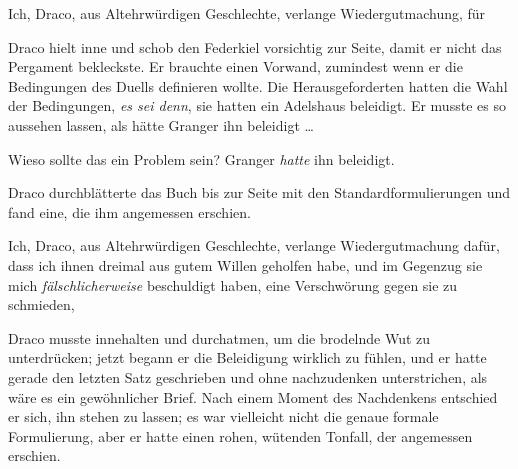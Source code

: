 \begin{writtenNote}
Ich, Draco, aus Altehrwürdigen Geschlechte, verlange Wiedergutmachung, für
\end{writtenNote}

Draco hielt inne und schob den Federkiel vorsichtig zur Seite, damit er nicht das Pergament bekleckste. Er brauchte einen Vorwand, zumindest wenn er die Bedingungen des Duells definieren wollte. Die Herausgeforderten hatten die Wahl der Bedingungen, \emph{es sei denn}, sie hatten ein Adelshaus beleidigt. Er musste es so aussehen lassen, als hätte Granger ihn beleidigt …

Wieso sollte das ein Problem sein? Granger \emph{hatte} ihn beleidigt.

Draco durchblätterte das Buch bis zur Seite mit den Standardformulierungen und fand eine, die ihm angemessen erschien.

\begin{writtenNote}
Ich, Draco, aus Altehrwürdigen Geschlechte, verlange Wiedergutmachung dafür, dass ich ihnen dreimal aus gutem Willen geholfen habe, und im Gegenzug sie mich \emph{fälschlicherweise} beschuldigt haben, eine Verschwörung gegen sie zu schmieden,
\end{writtenNote}

Draco musste innehalten und durchatmen, um die brodelnde Wut zu unterdrücken; jetzt begann er die Beleidigung wirklich zu fühlen, und er hatte gerade den letzten Satz geschrieben und ohne nachzudenken unterstrichen, als wäre es ein gewöhnlicher Brief. Nach einem Moment des Nachdenkens entschied er sich, ihn stehen zu lassen; es war vielleicht nicht die genaue formale Formulierung, aber er hatte einen rohen, wütenden Tonfall, der angemessen erschien.

